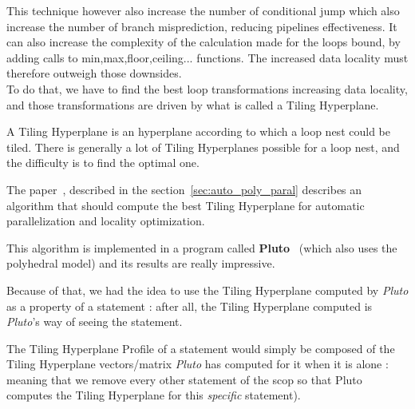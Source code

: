 \documentclass[paper=a4, fontsize=11.5pt]{scrartcl}
\numberwithin{equation}{section}        %
\numberwithin{figure}{section}          %
\numberwithin{table}{section}               %
\begin{document}
        \medskip

        This technique however also increase the number of conditional jump which also increase
        the number of branch misprediction, reducing pipelines effectiveness. It can also
        increase the complexity of the calculation made for the loops bound, by adding calls to
        min,max,floor,ceiling... functions.
        The increased data locality must therefore outweigh those downsides.\\
        To do that, we have to find the best loop transformations increasing data locality,
        and those transformations are driven by what is called a Tiling Hyperplane.

        A Tiling Hyperplane is an hyperplane according to which a loop nest could be tiled.
        There is generally a lot of Tiling Hyperplanes possible for a loop nest, and the difficulty
        is to find the optimal one.

        The paper~\cite{Bondhugula:2008:PAP:1379022.1375595}, described in the section~\ref{sec:auto_poly_paral}
        describes an algorithm that should compute the best Tiling Hyperplane for automatic
        parallelization and locality optimization.

        This algorithm is implemented in a program called \textbf{Pluto}~\cite{pluto} (which also
        uses the polyhedral model) and its results are really impressive.

        Because of that, we had the idea to use the Tiling Hyperplane computed by \textit{Pluto}
        as a property of a statement : after all, the Tiling Hyperplane computed is
        \textit{Pluto}'s way of seeing the statement.

        The Tiling Hyperplane Profile of a statement would simply be composed
        of the Tiling Hyperplane vectors/matrix \textit{Pluto} has computed for
        it when it is alone : meaning that we remove every other
        statement of the scop so that Pluto computes the Tiling Hyperplane for this \textit{specific}
        statement).


\end{document}
